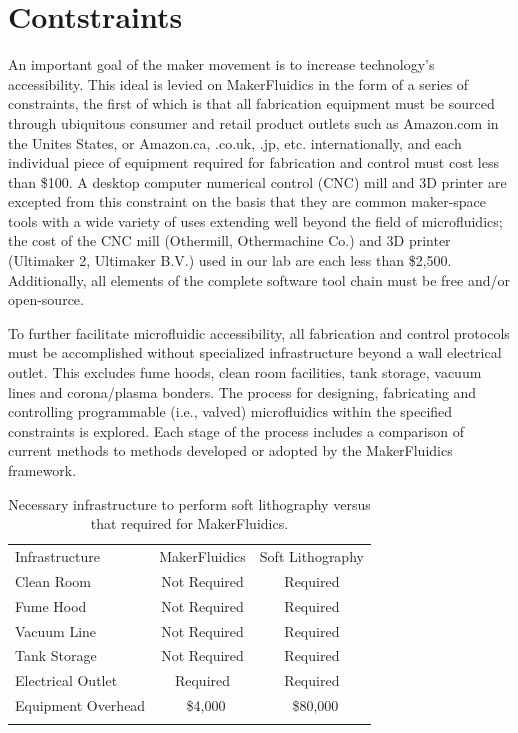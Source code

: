 \section{Contstraints}
\label{sec:mfConstraints}
An important goal of the maker movement is to increase technology's accessibility. This ideal is levied on MakerFluidics in the form of a series of constraints, the first of which is that all fabrication equipment must be sourced through ubiquitous consumer and retail product outlets such as Amazon.com in the Unites States, or Amazon.ca, .co.uk, .jp, etc. internationally, and each individual piece of equipment required for fabrication and control must cost less than \$100. A desktop computer numerical control (CNC) mill and 3D printer are excepted from this constraint on the basis that they are common maker-space tools with a wide variety of uses extending well beyond the field of microfluidics; the cost of the CNC mill (Othermill, Othermachine Co.) and 3D printer (Ultimaker 2, Ultimaker B.V.) used in our lab are each less than \$2,500. Additionally, all elements of the complete software tool chain must be free and/or open-source. 

To further facilitate microfluidic accessibility, all fabrication and control protocols must be accomplished without specialized infrastructure beyond a wall electrical outlet. This excludes fume hoods, clean room facilities, tank storage, vacuum lines and corona/plasma bonders. The process for designing, fabricating and controlling programmable (i.e., valved) microfluidics within the specified constraints is explored. Each stage of the process includes a comparison of current methods to methods developed or adopted by the MakerFluidics framework. 

\begin{table}[H]
\caption[Infrastructure requirements for soft lithography versus MakerFluidics]{Necessary infrastructure to perform soft lithography versus that required for MakerFluidics.}
\label{tab:mfInf}       %
\centering
\begin{tabular}{lcc}
\hline\noalign{\smallskip}
Infrastructure & MakerFluidics & Soft Lithography\\
\noalign{\smallskip}\hline\noalign{\smallskip}
Clean Room & Not Required & Required \\
Fume Hood & Not Required & Required \\
Vacuum Line & Not Required & Required \\
Tank Storage & Not Required & Required \\
Electrical Outlet & Required & Required \\
Equipment Overhead & ~\$4,000 & ~\$80,000 \\
\noalign{\smallskip}\hline
\end{tabular}
\end{table}


